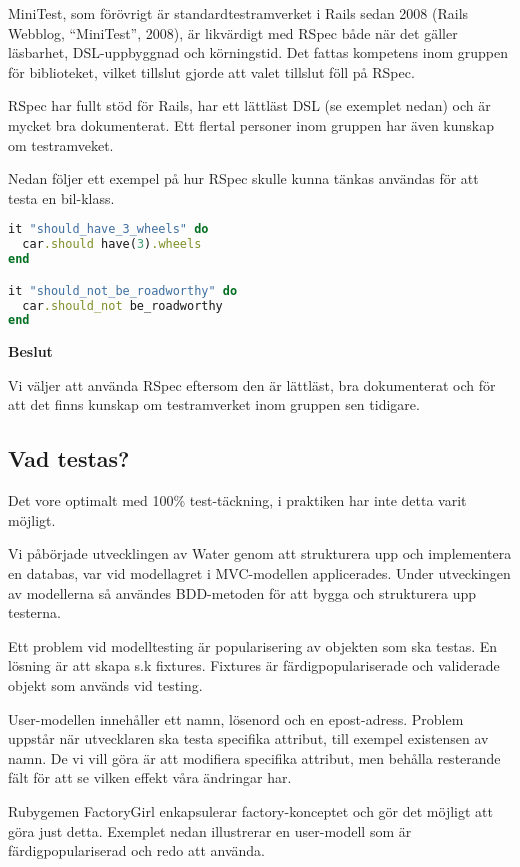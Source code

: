 MiniTest, som förövrigt är standardtestramverket i Rails sedan 2008 (Rails Webblog, “MiniTest”, 2008), är likvärdigt med RSpec både när det gäller läsbarhet, DSL-uppbyggnad och körningstid. Det fattas kompetens inom gruppen för biblioteket, vilket tillslut gjorde att valet tillslut föll på RSpec.

RSpec har fullt stöd för Rails, har ett lättläst DSL (se exemplet nedan) och är mycket bra dokumenterat. Ett flertal personer inom gruppen har även kunskap om testramveket.

Nedan följer ett exempel på hur RSpec skulle kunna tänkas användas för att testa en bil-klass.

\begin{lstlisting}[language=Ruby]
it "should_have_3_wheels" do
  car.should have(3).wheels
end

it "should_not_be_roadworthy" do
  car.should_not be_roadworthy
end
\end{lstlisting}


\begin{flushright}
  
  \textbf{Beslut}

  Vi väljer att använda RSpec eftersom den är lättläst, bra dokumenterat och för att det finns kunskap om testramverket inom gruppen sen tidigare.
\end{flushright}

\subsection{Vad testas?}
Det vore optimalt med 100\% test-täckning, i praktiken har inte detta varit möjligt.

Vi påbörjade utvecklingen av Water genom att strukturera upp och implementera en databas, var vid modellagret i MVC-modellen applicerades. Under utveckingen av modellerna så användes BDD-metoden för att bygga och strukturera upp testerna. 

Ett problem vid modelltesting är popularisering av objekten som ska testas. En lösning är att skapa s.k fixtures. Fixtures är färdigpopulariserade och validerade objekt som används vid testing.

User-modellen innehåller ett namn, lösenord och en epost-adress. Problem uppstår när utvecklaren ska testa specifika attribut, till exempel existensen av namn. De vi vill göra är att modifiera specifika attribut, men behålla resterande fält för att se vilken effekt våra ändringar har.

Rubygemen FactoryGirl enkapsulerar factory-konceptet och gör det möjligt att göra just detta. Exemplet nedan illustrerar en user-modell som är färdigpopulariserad och redo att använda.

